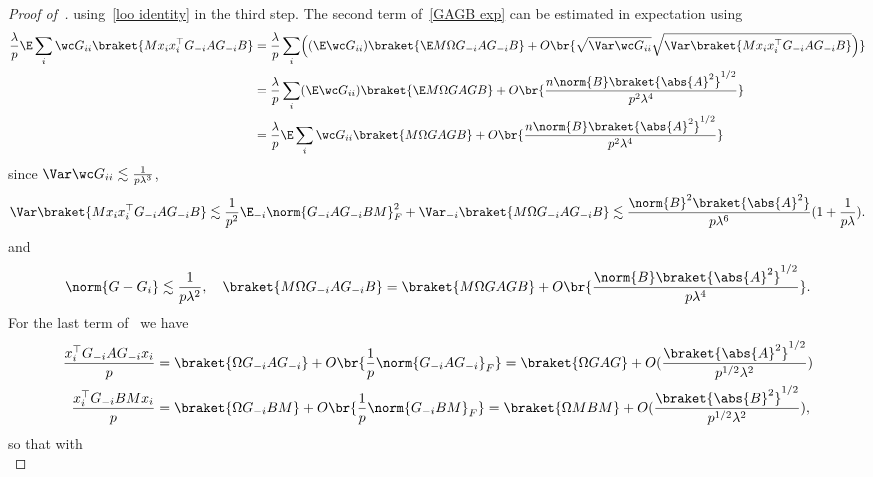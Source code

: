 \begin{proof}[Proof of~]
    using~\cref{loo identity} in the third step. The second term of~\cref{GAGB exp} can be estimated in expectation using
    \begin{equation}
        \begin{split}
            \frac{\lambda}{p}\E\sum_i\wc G_{ii} \braket{ M x_i x_i^\top G_{-i} AG_{-i} B} &= \frac{\lambda}{p}\sum_i\Bigl((\E\wc G_{ii}) \braket{\E M\Omega G_{-i} A G_{-i}B} + O\br{\sqrt{\Var \wc G_{ii}}\sqrt{\Var \braket{ M x_i x_i^\top G_{-i} AG_{-i} B}}\Bigr)}\\
            &=\frac{\lambda}{p}\sum_i(\E\wc G_{ii}) \braket{\E M\Omega G A GB} + O\br{\frac{n\norm{B}\braket{\abs{A}^2}^{1/2}}{p^2\lambda^{4}} } \\
            &= \frac{\lambda}{p}\E\sum_i \wc G_{ii} \braket{ M\Omega G A GB} + O\br{\frac{n\norm{B}\braket{\abs{A}^2}^{1/2}}{p^2\lambda^{4}} }
        \end{split}
    \end{equation}
    since $\Var \wc G_{ii}\lesssim \frac{1}{p\lambda^{3}}$,
    \begin{equation}
        \Var\braket{ M x_i x_i^\top G_{-i} A G_{-i} B } \lesssim \frac{1}{p^2}\E_{-i} \norm{G_{-i}A G_{-i} B M}_F^2 + \Var_{-i} \braket{M\Omega G_{-i} A G_{-i}B} \lesssim\frac{\norm{B}^2\braket{\abs{A}^2}}{p\lambda^6}(1+\frac{1}{p\lambda}).
    \end{equation}
    and
    \begin{equation}
        \norm{G-G_i} \lesssim \frac{1}{p\lambda^2}, \quad \braket{M\Omega G_{-i} A G_{-i} B}= \braket{M\Omega G A G B} + O\br{\frac{\norm{B}\braket{\abs{A}^2}^{1/2}}{p\lambda^4}}.
    \end{equation}
    For the last term of~ we have
    \begin{equation}
        \begin{split}
            \frac{x_i^\top G_{-i} AG_{-i}x_i}{p} &= \braket{\Omega G_{-i} A G_{-i}} + O\br{\frac{1}{p}\norm{G_{-i}AG_{-i}}_F}= \braket{\Omega G A G} + O (\frac{\braket{\abs{A}^2}^{1/2}}{p^{1/2}\lambda^2})\\
            \frac{x_i^\top G_{-i} B M x_i}{p} &= \braket{\Omega G_{-i} B M} + O\br{\frac{1}{p}\norm{G_{-i}BM}_F}= \braket{\Omega M B M} + O (\frac{\braket{\abs{B}^2}^{1/2}}{p^{1/2}\lambda^2}),
        \end{split}
    \end{equation}
    so that with
    \begin{equation}

\end{equation}
\end{proof}
